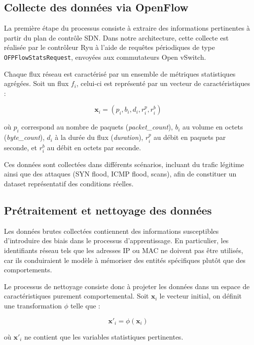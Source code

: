 \documentclass[11pt]{article}
\begin{document}
\subsection{Collecte des données via OpenFlow}

La première étape du processus consiste à extraire des informations pertinentes à partir du plan de contrôle SDN. Dans notre architecture, cette collecte est réalisée par le contrôleur Ryu à l’aide de requêtes périodiques de type \texttt{OFPFlowStatsRequest}, envoyées aux commutateurs Open vSwitch.

Chaque flux réseau est caractérisé par un ensemble de métriques statistiques agrégées. Soit un flux $f_i$, celui-ci est représenté par un vecteur de caractéristiques :

\begin{equation}
\mathbf{x}_i = (p_i, b_i, d_i, r^p_i, r^b_i)
\end{equation}

où $p_i$ correspond au nombre de paquets (\textit{packet\_count}), $b_i$ au volume en octets (\textit{byte\_count}), $d_i$ à la durée du flux (\textit{duration}), $r^p_i$ au débit en paquets par seconde, et $r^b_i$ au débit en octets par seconde.

Ces données sont collectées dans différents scénarios, incluant du trafic légitime ainsi que des attaques (SYN flood, ICMP flood, scans), afin de constituer un dataset représentatif des conditions réelles.

\subsection{Prétraitement et nettoyage des données}

Les données brutes collectées contiennent des informations susceptibles d’introduire des biais dans le processus d’apprentissage. En particulier, les identifiants réseau tels que les adresses IP ou MAC ne doivent pas être utilisés, car ils conduiraient le modèle à mémoriser des entités spécifiques plutôt que des comportements.

Le processus de nettoyage consiste donc à projeter les données dans un espace de caractéristiques purement comportemental. Soit $\mathbf{x}_i$ le vecteur initial, on définit une transformation $\phi$ telle que :

\begin{equation}
\mathbf{x}'_i = \phi(\mathbf{x}_i)
\end{equation}

où $\mathbf{x}'_i$ ne contient que les variables statistiques pertinentes.
\end{document}
